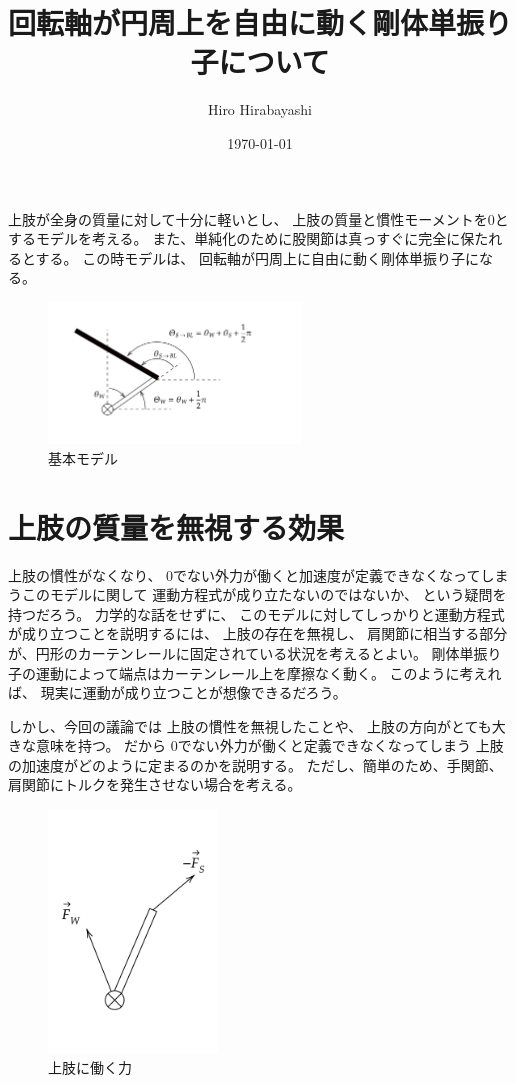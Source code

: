 \documentclass[a4paper,11pt]{jsarticle}
\begin{document}
\title{回転軸が円周上を自由に動く剛体単振り子について}
\author{Hiro Hirabayashi}
\date{\today}
\maketitle


上肢が全身の質量に対して十分に軽いとし、
上肢の質量と慣性モーメントを$0$とするモデルを考える。
また、単純化のために股関節は真っすぐに完全に保たれるとする。
この時モデルは、
回転軸が円周上に自由に動く剛体単振り子になる。

\begin{figure}[h]
  \centering
  \includegraphics[width = 0.6\textwidth]{config.png}
  \caption{基本モデル}
  \label{config.png}
\end{figure}

\section{上肢の質量を無視する効果}

上肢の慣性がなくなり、
0でない外力が働くと加速度が定義できなくなってしまうこのモデルに関して
運動方程式が成り立たないのではないか、
という疑問を持つだろう。
力学的な話をせずに、
このモデルに対してしっかりと運動方程式が成り立つことを説明するには、
上肢の存在を無視し、
肩関節に相当する部分が、円形のカーテンレールに固定されている状況を考えるとよい。
剛体単振り子の運動によって端点はカーテンレール上を摩擦なく動く。
このように考えれば、
現実に運動が成り立つことが想像できるだろう。

しかし、今回の議論では
上肢の慣性を無視したことや、
上肢の方向がとても大きな意味を持つ。
だから
0でない外力が働くと定義できなくなってしまう
上肢の加速度がどのように定まるのかを説明する。
ただし、簡単のため、手関節、肩関節にトルクを発生させない場合を考える。

\begin{figure}[h]
  \centering
  \includegraphics[width = 0.4\textwidth]{F_arm_config.png}
  \caption{上肢に働く力}
  \label{F_arm_config.png}
\end{figure}
\end{document}
